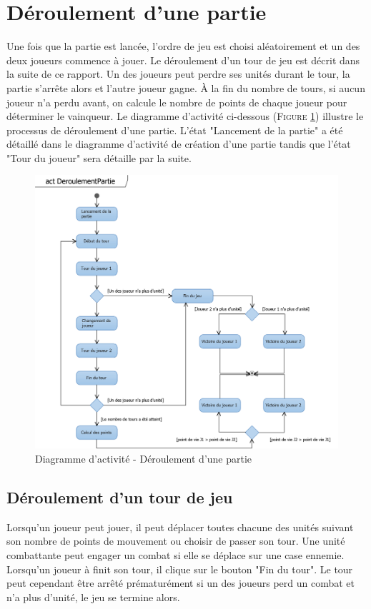 \documentclass[a4paper,11pt]{article}
\begin{document}
\section{Déroulement d'une partie}
	\vspace*{0.5cm}
	Une fois que la partie est lancée, l'ordre de jeu est choisi aléatoirement et un des deux joueurs commence à jouer. Le déroulement d'un tour de jeu est décrit dans la suite de ce rapport. Un des joueurs peut perdre ses unités durant le tour, la partie s'arrête alors et l'autre joueur gagne. À la fin du nombre de tours, si aucun joueur n'a perdu avant, on calcule le nombre de points de chaque joueur pour déterminer le vainqueur. Le diagramme d'activité ci-dessous (\textsc{Figure \ref{fig:actpartie}}) illustre le processus de déroulement d'une partie. L'état "Lancement de la partie" a été détaillé dans le diagramme d'activité de création d'une partie tandis que l'état "Tour du joueur" sera détaille par la suite.

	\vspace*{1cm}
	\begin{figure}[ht!]
		\includegraphics{actDeroulementPartie.png}
		\caption{Diagramme d'activité - Déroulement d'une partie}
		\label{fig:actpartie}
	\end{figure}
	\vspace*{1cm}
	\newpage

	\subsection{Déroulement d'un tour de jeu}
		\vspace*{0.5cm}
		Lorsqu'un joueur peut jouer, il peut déplacer toutes chacune des unités suivant son nombre de points de mouvement ou choisir de passer son tour. Une unité combattante peut engager un combat si elle se déplace sur une case ennemie. Lorsqu'un joueur à finit son tour, il clique sur le bouton "Fin du tour". Le tour peut cependant être arrêté prématurément si un des joueurs perd un combat et n'a plus d'unité, le jeu se termine alors.
		\vspace*{0.5cm}
\end{document}
